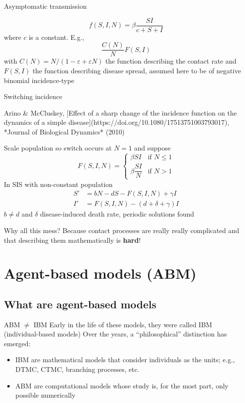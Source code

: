 \documentclass[aspectratio=43]{beamer}
\begin{document}
\begin{frame}{Asymptomatic transmission}

$$
f(S,I,N)
=\beta\frac{SI}{c+S+I}
$$
where $c$ is a constant. E.g., 
$$
\frac{C(N)}N F(S,I)
$$
with $C(N)=N/(1-\varepsilon+\varepsilon N)$ the function describing the contact rate and $F(S,I)$ the function describing disease spread, assumed here to be of negative binomial incidence-type
\end{frame}


\begin{frame}{Switching incidence}

Arino \& McCluskey, [Effect of a sharp change of the incidence function on the dynamics of a simple disease](https://doi.org/10.1080/17513751003793017), *Journal of Biological Dynamics* (2010)

Scale population so switch occurs at $N=1$ and suppose
$$
F(S,I,N) = 
\begin{cases}
\beta SI & \textrm{if }N\leq 1 \\
\beta \dfrac{SI}{N} & \textrm{if }N> 1
\end{cases}
$$
In SIS with non-constant population
\begin{align}
S' &= bN-dS-F(S,I,N)+\gamma I \\
I' &= F(S,I,N)-(d+\delta+\gamma)I
\end{align}
$b\neq d$ and $\delta$ disease-induced death rate, periodic solutions found
\end{frame}



\begin{frame}{Why all this mess?}
Because contact processes are really really complicated and that describing them mathematically is \textbf{hard}!	
\end{frame}
\section{Agent-based models (ABM)}

\subsection{What are agent-based models}

\begin{frame}{ABM $\neq$ IBM}
Early in the life of these models, they were called IBM (individual-based models)
\vfill
Over the years, a ``philosophical'' distinction has emerged:
\begin{itemize}
\item IBM are mathematical models that consider individuals as the units; e.g., DTMC, CTMC, branching processes, etc.
\item ABM are computational models whose study is, for the most part, only possible numerically 
\end{itemize}
\end{frame} 
\end{document}
